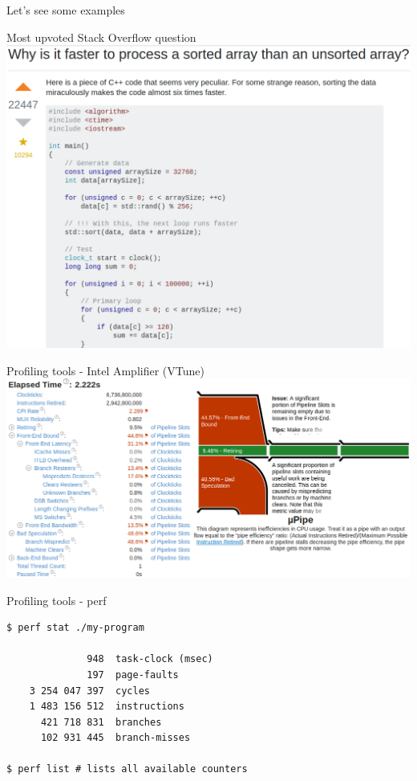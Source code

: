 \documentclass[hyperref={pdfpagelabels=false}]{beamer}
\begin{document}
\begin{frame}
	\begin{center}\Huge Let's see some examples\end{center}
\end{frame}
\begin{frame}{Most upvoted Stack Overflow question}
	\includegraphics[width=\textwidth]{stack-overflow}
\end{frame}
\begin{frame}{Profiling tools - Intel Amplifier (VTune)}
	\includegraphics[width=\textwidth]{vtune}
\end{frame}
\begin{frame}[fragile]{Profiling tools - perf}
	\begin{tcolorbox}
	\begin{verbatim}
$ perf stat ./my-program

	          948  task-clock (msec)
	          197  page-faults
	3 254 047 397  cycles
	1 483 156 512  instructions
	  421 718 831  branches
	  102 931 445  branch-misses

$ perf list # lists all available counters
	  \end{verbatim}
	  \end{tcolorbox}
\end{frame}
\end{document}
